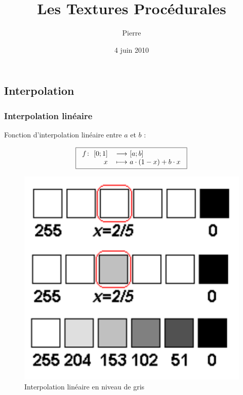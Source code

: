 \documentclass[12pt, a4paper]{article}
\newcommand{\fonction}[5]{
\begin{tabular}{rl}
    #1$\colon$ #2 & $\longrightarrow$ #3 \\
             #4 & $\longmapsto$ #5
\end{tabular}
}
\begin{document}
\title{Les Textures Procédurales}
\author{Pierre }
\date{4 juin 2010} 

\maketitle

\tableofcontents

\pagebreak

\subsection{Interpolation}

\subsubsection{Interpolation linéaire}

Fonction d'interpolation linéaire entre $a$ et $b$ :

\[
\boxed{
\fonction {$f$} {$[0;1]$} {$[a;b]$} {$x$} {$a \cdot (1-x) + b \cdot x$}
}
\]

\begin{figure}[!h]
	\centering
	   \caption{Interpolation linéaire en niveau de gris}
	   \bigskip
	   \includegraphics[scale=1]{interpolation}
\end{figure}
\end{document}
